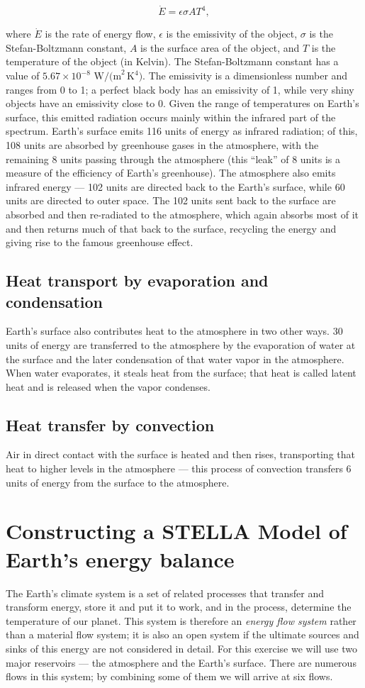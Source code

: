 \documentclass[11pt,letterpaper]{article}
\begin{document}
$$\dot{E} = \epsilon\sigma{A}T^4,$$

where $\dot{E}$ is the rate of energy flow, $\epsilon$ is the emissivity of the object, $\sigma$ is the Stefan-Boltzmann constant, $A$ is the
surface area of the object, and $T$ is the temperature of the object (in Kelvin). The Stefan-Boltzmann constant has a value of
$5.67\times{10}^{-8}\mbox{ W/(m}^2\,\mbox{K}^4\mbox{)}$. The emissivity is a dimensionless number and ranges from 0 to 1; a perfect black body has an emissivity of 1, while very shiny objects have an emissivity close to 0. Given the range of temperatures on Earth's surface, this emitted radiation occurs mainly within the infrared part of the spectrum. Earth's
surface emits 116 units of energy as infrared radiation; of this, 108 units are absorbed by greenhouse gases in the atmosphere, with the
remaining 8 units passing through the atmosphere (this ``leak'' of 8 units is a measure of the efficiency of Earth's greenhouse). The
atmosphere also emits infrared energy --- 102 units are directed back to the Earth's surface, while 60 units are directed to outer space. The 102 units sent back to the surface are absorbed and then re-radiated to the atmosphere, which again absorbs most of it and then returns much of
that back to the surface, recycling the energy and giving rise to the famous greenhouse effect.

\subsection{Heat transport by evaporation and condensation}
Earth's surface also contributes heat to the atmosphere in two other ways. 30 units of energy are transferred to the atmosphere by the
evaporation of water at the surface and the later condensation of that water vapor in the atmosphere. When water evaporates, it steals
heat from the surface; that heat is called latent heat and is released when the vapor condenses.

\subsection{Heat transfer by convection}
Air in direct contact with the surface is heated and then rises, transporting that heat to higher levels in the atmosphere --- this process of
convection transfers 6 units of energy from the surface to the atmosphere.

\section{Constructing a STELLA Model of Earth's energy balance}
The Earth's climate system is a set of related processes that transfer and transform energy, store it and put it to work,
and in the process, determine the temperature of our planet. This system is therefore an \textit{energy flow system} rather than a
material flow system; it is also an open system if the ultimate sources and sinks of this energy are not considered in detail. For this exercise we will use two major reservoirs --- the atmosphere and the Earth's surface. There are numerous flows in this system; by combining some of them we will arrive at six flows.
\end{document}
